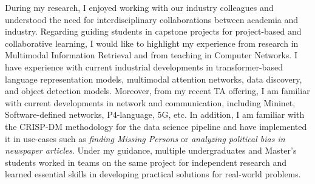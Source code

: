 \documentclass[11pt]{article}
\begin{document}
During my research, I enjoyed working with our industry colleagues and understood the need for interdisciplinary collaborations between academia and industry.
Regarding guiding students in capstone projects for project-based and collaborative learning, I would like to highlight my experience from research in Multimodal Information Retrieval and from teaching in Computer Networks. I have experience with current industrial developments in transformer-based language representation models, multimodal attention networks, data discovery, and object detection models. Moreover, from my recent TA offering, I am familiar with current developments in network and communication, including Mininet, Software-defined networks, P4-language, 5G, etc. In addition, I am familiar with the CRISP-DM methodology for the data science pipeline and have implemented it in use-cases such as \textit{finding Missing Persons} or \textit{analyzing political bias in newspaper articles}. Under my guidance, multiple undergraduates and Master's students worked in teams on the same project for independent research and learned essential skills in developing practical solutions for real-world problems.  


\end{document}
